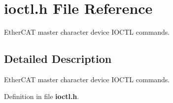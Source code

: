 \section{ioctl.\-h File Reference}
\label{ioctl_8h}


Ether\-C\-A\-T master character device I\-O\-C\-T\-L commands.  




\subsection{Detailed Description}
Ether\-C\-A\-T master character device I\-O\-C\-T\-L commands. 

Definition in file {\bf ioctl.\-h}.

